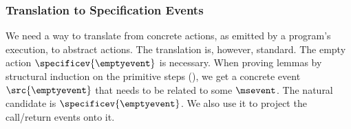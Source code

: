\documentclass[a4paper,names,dvipsnames]{article}
\begin{document}

\subsubsection{Translation to Specification Events}
We need a way to translate from concrete actions, as emitted by a program's execution, to abstract actions.
The translation is, however, standard.
The empty action $\specificev{\emptyevent}$ is necessary. When proving lemmas by structural induction on the primitive steps (), we get a concrete event $\src{\emptyevent}$ that needs to be related to some $\msevent$. The natural candidate is $\specificev{\emptyevent}$.
We also use it to project the call/return events onto it.
\end{document}
